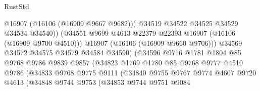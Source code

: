 \begin{lexlean}{RustStd}
\begin{coremodule}
                                          @16907
                                          (@16106 (@16909 @9667 @9682)))
                                        @34519
                                        @34522
                                        @34525
                                        @34529
                                        @34534
                                        @34540))
                                    (@34551
                                      @9699
                                      @4613
                                      @22379
                                      @22393
                                      @16907
                                      (@16106 (@16909 @9700 @4510)))
                                    @16907
                                    (@16106 (@16909 @9660 @9706)))
                                  @34569
                                  @34572
                                  @34575
                                  @34579
                                  @34584
                                  @34590)
                                (@34596
                                  @9716
                                  @1781
                                  @1804
                                  @85
                                  @9768
                                  @9786
                                  @9839
                                  @9857
                                  (@34823
                                    @1769
                                    @1780
                                    @85
                                    @9768
                                    @9777
                                    @4510
                                    @9786
                                    (@34833
                                      @9768
                                      @9775
                                      @9111
                                      (@34840
                                        @9755
                                        @9767
                                        @9774
                                        @4607
                                        @9720
                                        @4613
                                        (@34848
                                          @9744
                                          @9753
                                          (@34853
                                            @9744
                                            @9751
                                            @9084

\end{coremodule}
\end{lexlean}
